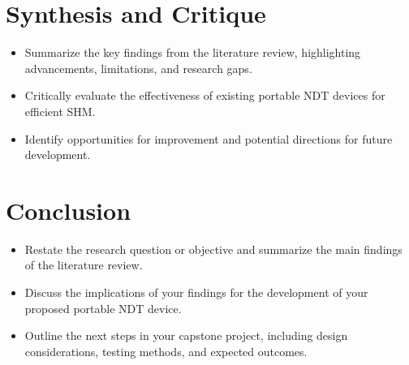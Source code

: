 \documentclass[journal, a4paper]{IEEEtran}
\begin{document}
\section{Synthesis and Critique}
\begin{itemize}
  \item Summarize the key findings from the literature review, highlighting advancements, limitations, and research gaps.
  \item Critically evaluate the effectiveness of existing portable NDT devices for efficient SHM.
  \item Identify opportunities for improvement and potential directions for future development.
\end{itemize}


\section{Conclusion}
\begin{itemize}
  \item Restate the research question or objective and summarize the main findings of the literature review.
  \item Discuss the implications of your findings for the development of your proposed portable NDT device.
  \item Outline the next steps in your capstone project, including design considerations, testing methods, and expected outcomes.
\end{itemize}








\ifCLASSOPTIONcaptionsoff
  \newpage
\fi






\end{document}
